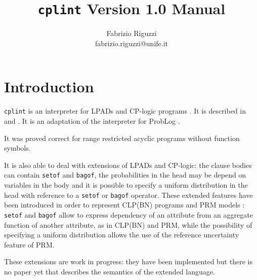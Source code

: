 \documentclass{article}
\begin{document}
\title{\texttt{cplint} Version 1.0 Manual}


\author{Fabrizio Riguzzi\\
fabrizio.riguzzi@unife.it}

\maketitle


\section{Introduction}

\texttt{cplint} is an interpreter for LPADs \cite{VenVer03-TR,VenVer04-ICLP04-IC} and CP-logic programs \cite{VenDenBru-JELIA06,CP-logic-unp}. It is described in \cite{Rig-AIIA07-IC} and \cite{Rig-RCRA07-IC}. It is an adaptation of the interpreter for ProbLog \cite{DBLP:conf/ijcai/RaedtKT07}.

It was proved correct \cite{Rig-RCRA07-IC} for range restricted acyclic programs \cite{DBLP:journals/ngc/AptB91} without function symbols.

It is also able to deal with extensions of LPADs and CP-logic: the clause bodies can contain \texttt{setof} and \texttt{bagof}, the probabilities in the head may be depend on variables in the body and it is possible to specify a uniform distribution in the head with reference to a \texttt{setof} or \texttt{bagof} operator. These extended features have been introduced in order to represent CLP(BN) \cite{SanPagQaz03-UAI-IC} programs and PRM models \cite{Getoor+al:JMLR02}:
\texttt{setof} and \texttt{bagof} allow to express dependency of an attribute from an aggregate function of another attribute, as in CLP(BN)  and PRM, while the possibility of specifying a uniform distribution allows the use of the reference uncertainty feature of PRM.

These extensions are work in progress: they have been implemented but there is no paper yet that describes the semantics of the extended language. 

\end{document}
